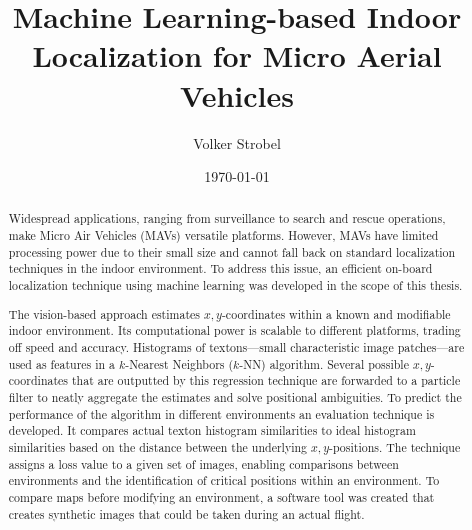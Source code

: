 \documentclass[11pt]{report}
\title{Machine Learning-based Indoor Localization for Micro
  Aerial Vehicles}
\author{Volker Strobel}
\date{\today}
\begin{document}
\maketitle
\begin{abstract}
  Widespread applications, ranging from surveillance to search and
  rescue operations, make Micro Air Vehicles (MAVs) versatile
  platforms. However, MAVs have limited processing power due to their
  small size and cannot fall back on standard localization techniques
  in the indoor environment.
  To address this issue, an efficient on-board
  localization technique using machine learning was developed in the
  scope of this thesis.

  The vision-based approach estimates $x,y$-coordinates within a known
  and modifiable indoor environment. Its computational power is
  scalable to different platforms, trading off speed and
  accuracy. Histograms of textons---small characteristic image
  patches---are used as features in a $k$-Nearest Neighbors ($k$-NN)
  algorithm. Several possible $x,y$-coordinates that are outputted by
  this regression technique are forwarded to a particle filter to
  neatly aggregate the estimates and solve positional ambiguities.
  To predict the performance of the algorithm in different
  environments an evaluation technique is developed. It compares
  actual texton histogram similarities to ideal histogram similarities
  based on the distance between the underlying $x,y$-positions. The
  technique assigns a loss value to a given set of images, enabling
  comparisons between environments and the identification of critical
  positions within an environment. To compare maps before modifying an
  environment, a software tool was created that creates synthetic
  images that could be taken during an actual flight.





\end{abstract}
\end{document}
